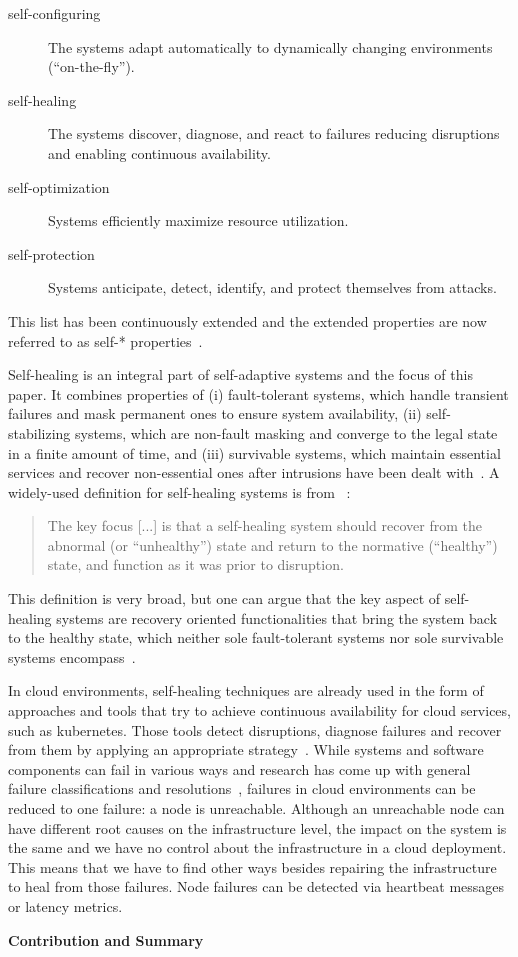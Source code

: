   \begin{description}
    \item[self-configuring] The systems adapt automatically to dynamically changing environments (\enquote{on-the-fly}).
    \item[self-healing] The systems discover, diagnose, and react to failures reducing disruptions and enabling continuous availability.
    \item[self-optimization] Systems efficiently maximize resource utilization.
    \item[self-protection] Systems anticipate, detect, identify, and protect themselves from attacks.
  \end{description}

  This list has been continuously extended and the extended properties are now referred to as self-* properties~\cite{PsaierSurvey}.

  Self-healing is an integral part of self-adaptive systems and the focus of this paper.
  It combines properties of
  (i) fault-tolerant systems, which handle transient failures and mask permanent ones to ensure system availability,
  (ii) self-stabilizing systems, which are non-fault masking and converge to the legal state in a finite amount of time, and 
  (iii) survivable systems, which maintain essential services and recover non-essential ones after intrusions have been dealt with~\cite{PsaierSurvey}.
  A widely-used definition for self-healing systems is from \citeauthor{Ghosh}~\cite{Ghosh}:

  \begin{quote}
    The key focus [...] is that a self-healing system should recover from the abnormal (or \enquote{unhealthy}) state and return to the normative (\enquote{healthy}) state, and function as it was prior to disruption.
  \end{quote}

  This definition is very broad, but one can argue that the key aspect of self-healing systems are recovery oriented functionalities that bring the system back to the healthy state, which neither sole fault-tolerant systems nor sole survivable systems encompass~\cite{PsaierSurvey}.

  In cloud environments, self-healing techniques are already used in the form of approaches and tools that try to achieve continuous availability for cloud services, such as \gls{kubernetes}.
  Those tools detect disruptions, diagnose failures and recover from them by applying an appropriate strategy~\cite{PsaierSurvey}.
  While systems and software components can fail in various ways and research has come up with general failure classifications and resolutions~\cite[Tab.~1]{PsaierSurvey}, failures in cloud environments can be reduced to one failure: a node is unreachable.
  Although an unreachable node can have different root causes on the infrastructure level, the impact on the system is the same and we have no control about the infrastructure in a cloud deployment.
  This means that we have to find other ways besides repairing the infrastructure to heal from those failures.
  Node failures can be detected via heartbeat messages or latency metrics.

  \textbf{Contribution and Summary}